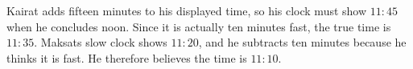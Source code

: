 Kairat adds fifteen minutes to his displayed time, so his clock must show $11{:}45$ when he concludes noon. Since it is actually ten minutes fast, the true time is $11{:}35$. Maksat\textquotesingle s slow clock shows $11{:}20$, and he subtracts ten minutes because he thinks it is fast. He therefore believes the time is $\boxed{11{:}10}$.
